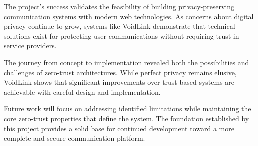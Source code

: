 The project's success validates the feasibility of building privacy-preserving communication systems with modern web technologies. As concerns about digital privacy continue to grow, systems like VoidLink demonstrate that technical solutions exist for protecting user communications without requiring trust in service providers.

The journey from concept to implementation revealed both the possibilities and challenges of zero-trust architectures. While perfect privacy remains elusive, VoidLink shows that significant improvements over trust-based systems are achievable with careful design and implementation.

Future work will focus on addressing identified limitations while maintaining the core zero-trust properties that define the system. The foundation established by this project provides a solid base for continued development toward a more complete and secure communication platform.

